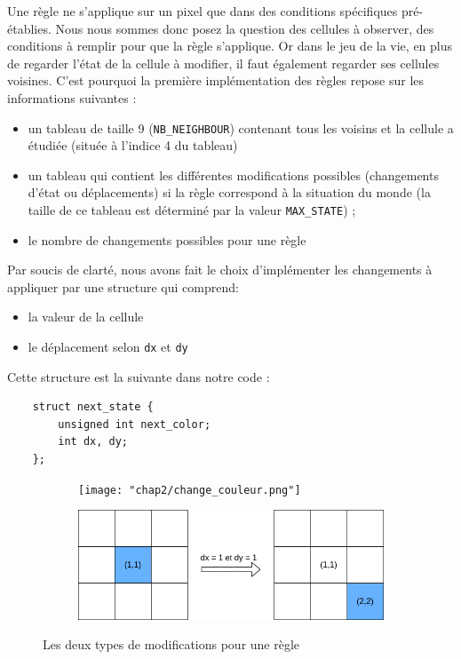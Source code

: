 Une règle ne s'applique sur un pixel que dans des conditions spécifiques pré-établies. Nous nous sommes donc posez la question des cellules à observer, des conditions à remplir pour que la règle s'applique. Or dans le jeu de la vie, en plus de regarder l'état de la cellule à modifier, il faut également regarder ses cellules voisines. C'est pourquoi la première  implémentation des règles repose sur les informations suivantes :
\begin{itemize}
    \item un tableau de taille 9 (\lstinline{NB_NEIGHBOUR}) contenant tous les voisins et la cellule a étudiée (située à l'indice 4 du tableau)
    \item un tableau qui contient les différentes modifications possibles (changements d'état ou déplacements) si la règle correspond à la situation du monde (la taille de ce tableau est déterminé par la valeur \lstinline{MAX_STATE}) ;
    \item le nombre de changements possibles pour une règle
\end{itemize}
\vspace{\parskip}

Par soucis de clarté, nous avons fait le choix d'implémenter les changements à appliquer par une structure qui comprend:
\begin{itemize}
    \item la valeur de la cellule
    \item le déplacement selon \texttt{dx} et \texttt{dy}
\end{itemize}

Cette structure est la suivante dans notre code :
\begin{lstlisting}
    struct next_state {
        unsigned int next_color;
        int dx, dy;
    };
\end{lstlisting}
\vspace{\parskip}

\begin{figure}[h!]
    \centering
    \begin{subfigure}{0.75\textwidth}
        \texttt{[image: "chap2/change\_couleur.png"]}
        \label{fig:chgt_color}
        \bigskip
    \end{subfigure}

    \begin{subfigure}{0.75\textwidth}
        \includegraphics[width=\textwidth]{img/chap2/change_mov.png}
        \label{fig:chgt_move}
    \end{subfigure}
    \caption{Les deux types de modifications pour une règle}
    \label{fig:modif_types}
\end{figure}

